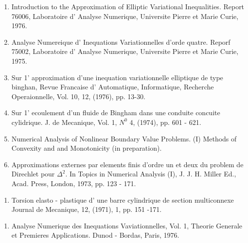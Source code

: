 \begin{thebibliography}{99}

  \begin{enumerate}
  \item Introduction to the Approximation of Elliptic Variational
 Inequalities. Report 76006, Laboratoire d' Analyse Numerique,
 Universite Pierre et Marie Curie, 1976.\label{k51:e1} 

  \item  Analyse Numereique d' Inequations Variationnelles d'orde
 quatre. Reporf 75002, Laboratoire d' Analyse Numerique, Universite
 Pierre et Marie Curie, 1975.\label{k51:e2} 

  \item Sur 1' approximation d'une inequation variationnelle
 elliptique de type binghan, Revue Francaise d' Automatique,
 Informatique, Recherche Operaionnelle, Vol. 10, 12, (1976),
 pp. 13-30.\label{k51:e3} 

  \item Sur 1' ecoulement d'un fluide de Bingham dans une conduite
 concuite cylidrique. J. de Mecanique, Vol. 1, $N^0$ 4, (1974),
 pp. 601 - 621.\label{k51:e4} 

  \item Numerical Analysis of Nonlinear Boundary Value Problems. (I)
 Methods of Convexity and and Monotonicity (in preparation).\label{k51:e5} 

  \item Approximations externes par elements finis d'ordre un et deux
 du problem de Direchlet pour $\Delta^2$. In Topics in Numerical
 Analysis (I), J. J. H. Miller Ed., Acad. Press, London, 1973,
 pp. 123 - 171.\label{k51:e6}
  \end{enumerate}


  \begin{enumerate}
  \item Torsion elasto - plastique d' une barre cylindrique de section
 multiconnexe Journal de Mecanique, 12, (1971), 1, pp. 151
 -171.\label{k52:e1}  
  \end{enumerate}


  \begin{enumerate}
  \item  Analyse Numerique des Inequations Vaviationnelles, Vol. 1,
 Theorie Generale et Premieres Applications. Dunod - Bordas, Paris,
 1976.\label{k53:e1}  


\end{enumerate}
\end{thebibliography}
